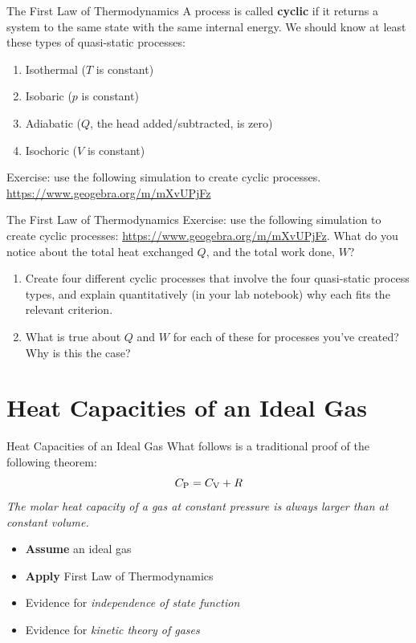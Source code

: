 \documentclass{beamer}
\begin{document}
\begin{frame}{The First Law of Thermodynamics}
A process is called \textbf{cyclic} if it returns a system to the same state with the same internal energy.
We should know at least these types of quasi-static processes: \small 
\begin{enumerate}
\item Isothermal ($T$ is constant)
\item Isobaric ($p$ is constant)
\item Adiabatic ($Q$, the head added/subtracted, is zero)
\item Isochoric ($V$ is constant)
\end{enumerate}
Exercise: use the following simulation to create cyclic processes.
\url{https://www.geogebra.org/m/mXvUPjFz}
\end{frame}

\begin{frame}{The First Law of Thermodynamics}
Exercise: use the following simulation to create cyclic processes: \url{https://www.geogebra.org/m/mXvUPjFz}.  What do you notice about the total heat exchanged $Q$, and the total work done, $W$?
\begin{enumerate}
\item Create four different cyclic processes that involve the four quasi-static process types, and explain quantitatively (in your lab notebook) why each fits the relevant criterion.
\item What is true about $Q$ and $W$ for each of these for processes you've created?  Why is this the case?
\end{enumerate}
\end{frame}

\section{Heat Capacities of an Ideal Gas}

\begin{frame}{Heat Capacities of an Ideal Gas}
\small What follows is a traditional proof of the following theorem:
\begin{equation}
C_{\rm P} = C_{\rm V} + R
\end{equation}
\textit{The molar heat capacity of a gas at constant pressure is always larger than at constant volume.} \\ \vspace{0.5cm}
\begin{itemize}
\item \textbf{Assume} an ideal gas
\item \textbf{Apply} First Law of Thermodynamics
\item Evidence for \textit{independence of state function}
\item Evidence for \textit{kinetic theory of gases}
\end{itemize}
\end{frame}
\end{document}
